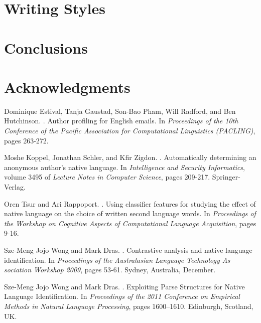 \documentclass[11pt]{article}
\begin{document}
\section{Writing Styles}


\section{Conclusions}

\section*{Acknowledgments}

\begin{thebibliography}{}

Dominique Estival, Tanja Gaustad, Son-Bao Pham, Will Radford, and Ben Hutchinson.
.
\newblock Author profiling for English emails. In {\em Proceedings of the 10th Conference of the Pacific Association for Computational Linguistics (PACLING)}, pages 263-272.

Moshe Koppel, Jonathan Schler, and Kfir Zigdon.
.
\newblock Automatically determining an anonymous author’s native language. In {\em Intelligence and Security Informatics}, volume 3495 of {\em Lecture Notes in Computer Science}, pages 209-217.
\newblock Springer-Verlag.

Oren Tsur and Ari Rappoport.
.
\newblock Using classifier features for studying the effect of native language on the choice of written second language words. In {\em Proceedings of the Workshop on Cognitive Aspects of Computational Language Acquisition}, pages 9-16.

Sze-Meng Jojo Wong and Mark Dras.
.
\newblock Contrastive analysis and native language identification. In {\em Proceedings of the Australasian Language Technology As sociation Workshop 2009}, pages 53-61.
\newblock Sydney, Australia, December.

Sze-Meng Jojo Wong and Mark Dras.
.
\newblock Exploiting Parse Structures for Native Language Identification. In {\em Proceedings of the 2011 Conference on Empirical Methods in Natural Language Processing}, pages 1600–1610.
\newblock Edinburgh, Scotland, UK.

\end{thebibliography}
\end{document}
